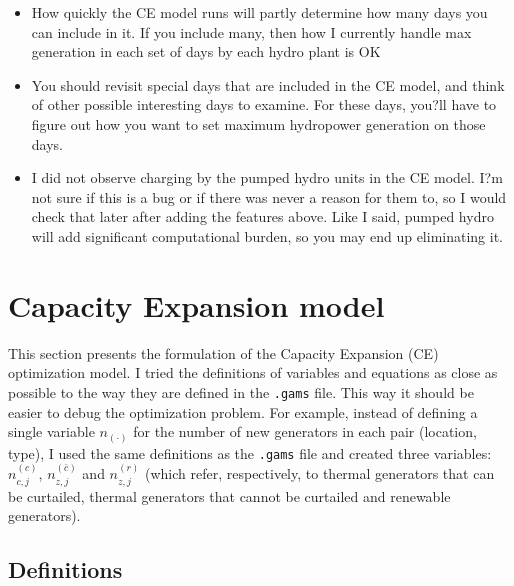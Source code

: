 \documentclass[11pt, oneside]{article}   	%
\newcommand{\bc}{\bar{c}}
\begin{document}
\begin{itemize}
\item How quickly the CE model runs will partly determine how many days you can include in it. If you include many, then how I currently handle max generation in each set of days by each hydro plant is OK
\item You should revisit special days that are included in the CE model, and think of other possible interesting days to examine. For these days, you?ll have to figure out how you want to set maximum hydropower generation on those days. 
\item I did not observe charging by the pumped hydro units in the CE model. I?m not sure if this is a bug or if there was never a reason for them to, so I would check that later after adding the features above. Like I said, pumped hydro will add significant computational burden, so you may end up eliminating it.
\end{itemize}


\newpage
\section{Capacity Expansion model}

This section presents the formulation of the Capacity Expansion (CE) optimization model. I tried the definitions of variables and equations as close as possible to the way they are defined in the \texttt{.gams} file. This way it should be easier to debug the optimization problem. For example, instead of defining a single variable $n_{(\cdot)}$ for the number of new generators in each pair (location, type), I used the same definitions as the \texttt{.gams} file and created three variables: $n^{(c)}_{c, j}$, $n^{(\bc)}_{z, j}$ and $n^{(r)}_{z, j}$ (which refer, respectively, to thermal generators that can be curtailed, thermal generators that cannot be curtailed and renewable generators).

\subsection{Definitions}
\end{document}
